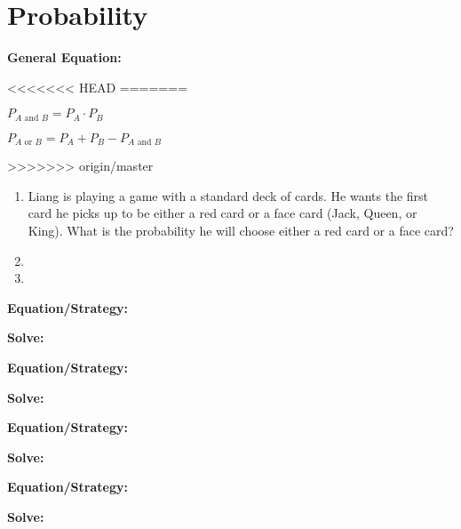 \section{Probability}

\textbf{General Equation:}

<<<<<<< HEAD
=======
\begin{center}
\renewcommand{\columnseprule}{0pt}
\begin{multicols}{2}
$P_{A\mbox{ and }B}=P_A\cdot P_B$

$P_{A\mbox{ or }B}=P_A+P_B-P_{A\mbox{ and }B}$
\end{multicols}
\end{center}

>>>>>>> origin/master
\begin{enumerate}[labelindent=*,style=multiline,leftmargin=*,label=\textbf{Example \arabic*:}]
\item Liang is playing a game with a standard deck of cards. He wants the first card he picks up to be either a red card or a face card (Jack, Queen, or King). What is the probability he will choose either a red card or a face card?
\vfill\item
\vfill\item
\end{enumerate}

\vfill
\newpage
\begin{multicols*}{2}
\begin{outline}[enumerate]
\medium

\1 

\bigskip
\textbf{Equation/Strategy:} \hrulefill

\bigskip
\textbf{Solve:}

\vfill
\2 
\2 
\2 
\2 
\2 

\midline

\1 

\bigskip
\textbf{Equation/Strategy:} \hrulefill

\bigskip
\textbf{Solve:}

\vfill
\2 
\2 
\2 
\2 
\2 

\columnbreak
\advanced

\1 

\bigskip
\textbf{Equation/Strategy:} \hrulefill

\bigskip
\textbf{Solve:}

\vfill
\2 
\2 
\2 
\2 
\2 

\midline

\1 

\bigskip
\textbf{Equation/Strategy:}

\bigskip
\textbf{Solve:}

\vfill
\2
\2
\2
\2
\2
\end{outline}
\end{multicols*}